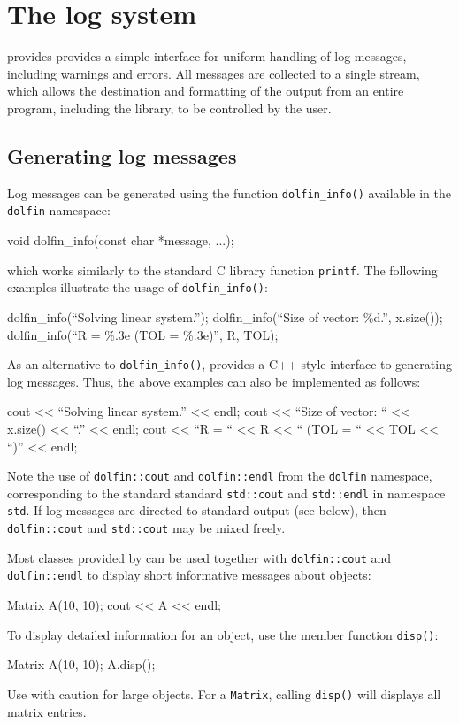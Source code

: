 \chapter{The log system}

\dolfin{} provides provides a simple interface for uniform handling of
log messages, including warnings and errors. All messages are
collected to a single stream, which allows the destination and
formatting of the output from an entire program, including the
\dolfin{} library, to be controlled by the user.

\section{Generating log messages}

Log messages can be generated using the function
\texttt{dolfin\_info()} available in the \texttt{dolfin} namespace:
\begin{code}
  void dolfin_info(const char *message, ...);
\end{code}
which works similarly to the standard C library function \texttt{printf}.
The following examples illustrate the usage of
\texttt{dolfin\_info()}:
\begin{code}
  dolfin_info(``Solving linear system.'');
  dolfin_info(``Size of vector: \%d.'', x.size());
  dolfin_info(``R = \%.3e (TOL = \%.3e)'', R, TOL);
\end{code}

As an alternative to \texttt{dolfin\_info()}, \dolfin{} provides a C++
style interface to generating log messages. Thus, the above examples
can also be implemented as follows:
\footnotesize
\begin{code}
  cout << ``Solving linear system.'' << endl;
  cout << ``Size of vector: `` << x.size() << ``.'' << endl;
  cout << ``R = `` << R << `` (TOL = `` << TOL << ``)'' << endl;
\end{code}
\normalsize
Note the use of \texttt{dolfin::cout} and
\texttt{dolfin::endl} from the \texttt{dolfin} namespace,
corresponding to the standard standard \texttt{std::cout} and
\texttt{std::endl} in namespace \texttt{std}. If log messages are
directed to standard output (see below), then \texttt{dolfin::cout}
and \texttt{std::cout} may be mixed freely.

Most classes provided by \dolfin{} can be used together with
\texttt{dolfin::cout} and \texttt{dolfin::endl} to display short
informative messages about objects:
\begin{code}
  Matrix A(10, 10);
  cout << A << endl;
\end{code}
To display detailed information for an object,  use the member function
\texttt{disp()}:
\begin{code}
  Matrix A(10, 10);
  A.disp();
\end{code}
Use with caution for large objects. For a \texttt{Matrix}, calling
\texttt{disp()} will displays all matrix entries.

